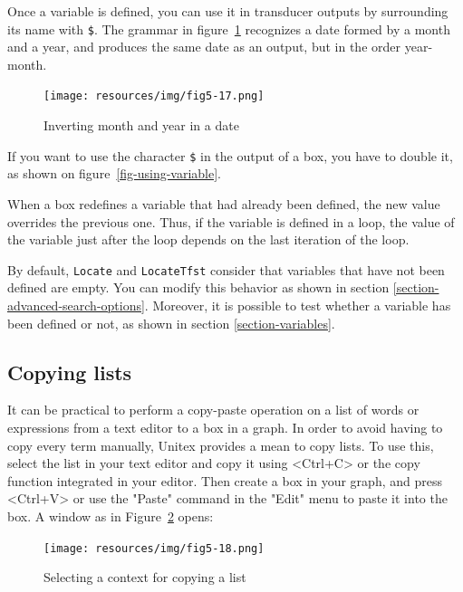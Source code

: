 \bigskip
\noindent Once a variable is defined, you can use it in transducer outputs by
surrounding its name with \verb+$+.\index{\verbt{\$}} The grammar in
figure~\ref{fig-date-grammar} recognizes a date formed by a month and a
year, and produces the same date as an output, but in the order year-month.

\bigskip
\begin{figure}[!ht]
\begin{center}
\texttt{[image: resources/img/fig5-17.png]}
\caption{Inverting month and year in a date\label{fig-date-grammar}}
\end{center}
\end{figure}

\noindent If you want to use the character \verb+$+ in the output of a box, you
have to double it, as shown on figure~\ref{fig-using-variable}.

\bigskip
\noindent When a box redefines a variable that had already been defined,
 the new value overrides the previous one.
Thus, if the variable is defined in a loop,
the value of the variable just after the loop depends on the last iteration of the loop.

\bigskip
\noindent By default, \verb+Locate+ and \verb+LocateTfst+ 
consider that variables that have not been defined are empty.
You can
modify this behavior as shown in section \ref{section-advanced-search-options}.
Moreover, it is possible to test whether a variable has been defined or not, as
shown in section \ref{section-variables}.

\subsection{Copying lists}

It can be practical to perform a copy-paste operation on a list of words or
expressions from a text editor to a box in a graph. In order to avoid having to
copy every term manually, Unitex provides a mean to copy lists. To use this,
select the list in your text editor and copy it using <Ctrl+C> or the copy
function integrated in your editor. Then create a box in your graph, and press
<Ctrl+V> or use the "Paste" command in the "Edit" menu to paste it into the box.
A window as in Figure~\ref{fig-setting-contexts-for-multiple-copy}
opens:

\bigskip
\begin{figure}[!ht]
\begin{center}
\texttt{[image: resources/img/fig5-18.png]}
\caption{Selecting a context for copying a list\label{fig-setting-contexts-for-multiple-copy}}
\end{center}
\end{figure}

